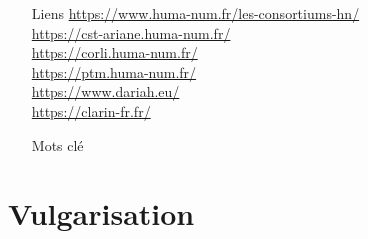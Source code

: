 \documentclass{book}
\begin{document}
\begin{itemize}
    \item [Liens]
        \url{https://www.huma-num.fr/les-consortiums-hn/}\label{liste_ariane_consortium}\\
        \url{https://cst-ariane.huma-num.fr/}\\
        \url{https://corli.huma-num.fr/}\\
        \url{https://ptm.huma-num.fr/}\\
        \url{ https://www.dariah.eu/}\\
        \url{https://clarin-fr.fr/}\\
       
    \item [Mots clé]
\end{itemize}


\section{Vulgarisation}
\end{document}

